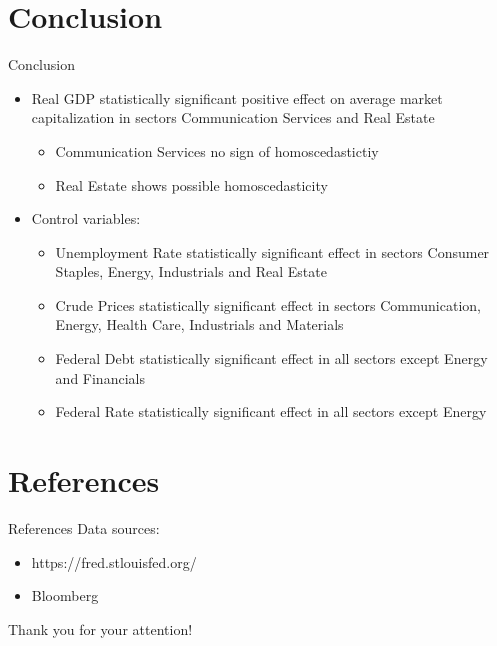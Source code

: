 \documentclass[11pt]{beamer}
\begin{document}
\section{Conclusion}

\begin{frame}{Conclusion}

 \begin{itemize}
        \item Real GDP statistically significant positive effect on average market capitalization in sectors Communication Services and Real Estate
        \begin{itemize}
        \item Communication Services no sign of homoscedastictiy
        \item Real Estate shows possible homoscedasticity
        \end{itemize}
\end{itemize}
 \begin{itemize}
 \item Control variables:
        \begin{itemize}
        \item Unemployment Rate statistically significant effect in sectors Consumer Staples, Energy, Industrials and Real Estate
        \item Crude Prices statistically significant effect in sectors Communication, Energy, Health Care, Industrials and Materials
        \item Federal Debt statistically significant effect in all sectors except Energy and Financials 
        \item Federal Rate statistically significant effect in all sectors except Energy 
        \end{itemize}
\end{itemize}

\end{frame}

\section{References}
\begin{frame}{References}
Data sources:
\begin{itemize}
    \item https://fred.stlouisfed.org/
    \item  Bloomberg
\end{itemize}
\end{frame}

\begin{frame}{}

\begin{center}

    Thank you for your attention!
\end{center}

\end{frame}
\end{document}
